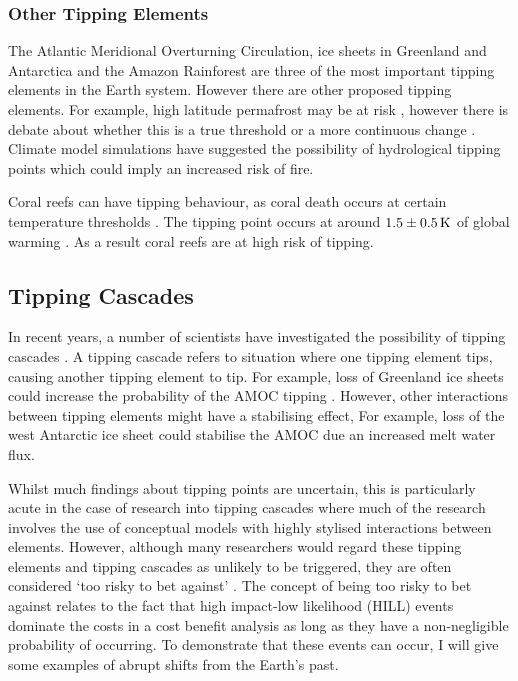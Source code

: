 \subsubsection{Other Tipping Elements}
The Atlantic Meridional Overturning Circulation, ice sheets in Greenland and Antarctica and the Amazon Rainforest are three of the most important tipping elements in the Earth
system. However there are other proposed tipping elements. For example, high latitude permafrost may be at risk \parencite{Lenton2012a}, however there is debate about whether this is
a true threshold or a more continuous change \parencite{ArmstrongMcKay2022}. Climate model simulations have suggested the possibility of hydrological tipping points
\parencite{Teufel2019} which could imply an increased risk of fire.

Coral reefs can have tipping behaviour, as coral death occurs at certain temperature thresholds \parencite{Frieler2013}. The tipping point occurs at around $\SI{1.5\pm0.5}{\kelvin}$ of global
warming \parencite{ArmstrongMcKay2022}. As a result coral reefs are at high risk of tipping.

\subsection{Tipping Cascades}
In recent years, a number of scientists have investigated the possibility of tipping cascades
\parencite{Steffen2018,Wunderling2023,Wunderling2021,Rocha2018,Lenton2013a,Kriegler2009,Klose2021}.
A tipping cascade refers to situation where one tipping element tips, causing another tipping element to tip. For example, loss of Greenland ice sheets could increase
the probability of the AMOC tipping \parencite{Caesar2018,Rahmstorf2015}. However, other interactions between tipping elements might have a stabilising effect, For example,
loss of the west Antarctic ice sheet could stabilise the AMOC \parencite{Sinet2023} due an increased melt water flux.

Whilst much findings about tipping points are uncertain,
this is particularly acute in the case of research into tipping cascades where much of the research involves the use of conceptual models with highly stylised interactions between elements.
However, although many researchers would  regard these tipping elements and tipping cascades as unlikely to be triggered, they are often considered `too risky to bet against' \parencite{Lenton2019a}.
The concept of being too risky to bet against relates to the fact
that high impact-low likelihood (HILL) events \parencite{Wood2023} dominate the costs in a cost benefit analysis \parencite{Weitzman2009} as long as they have a non-negligible probability of occurring.
To demonstrate that these events can occur, I will give some examples of abrupt shifts from the Earth's past.

